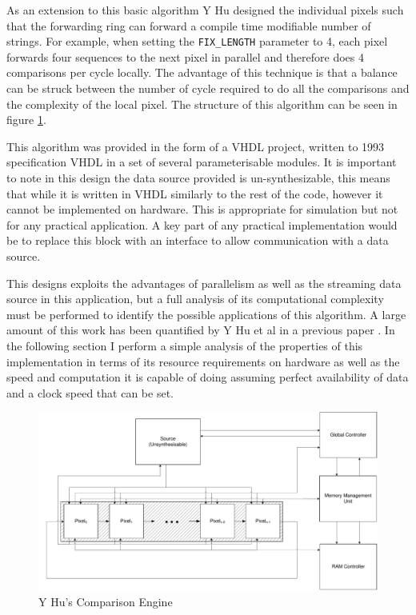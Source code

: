 As an extension to this basic algorithm Y Hu designed the individual pixels such that the forwarding ring can forward a compile time modifiable number of strings. For example, when setting the \verb|FIX_LENGTH| parameter to 4, each pixel forwards four sequences to the next pixel in parallel and therefore does 4 comparisons per cycle locally. The advantage of this technique is that a balance can be struck between the number of cycle required to do all the comparisons and the complexity of the local pixel. The structure of this algorithm can be seen in figure \ref{fig:CE}. 

This algorithm was provided in the form of a VHDL project, written to 1993 specification VHDL in a set of several parameterisable modules. It is important to note in this design the data source provided is un-synthesizable, this means that while it is written in VHDL similarly to the rest of the code, however it cannot be implemented on hardware. This is appropriate for simulation but not for any practical application. A key part of any practical implementation would be to replace this block with an interface to allow communication with a data source.

This designs exploits the advantages of parallelism as well as the streaming data source in this application, but a full analysis of its computational complexity must be performed to identify the possible applications of this algorithm. A large amount of this work has been quantified by Y Hu et al in a previous paper \cite{hu2012cmos} . In the following section I perform a simple analysis of the properties of this implementation in terms of its resource requirements on hardware as well as the speed and computation it is capable of doing assuming perfect availability of data and a clock speed that can be set.

\begin{figure}[h]
  \centering
  \includegraphics[width=\textwidth]{./figs/UnModified.pdf}
  \caption{Y Hu's Comparison Engine}
  \label{fig:CE}
\end{figure}

